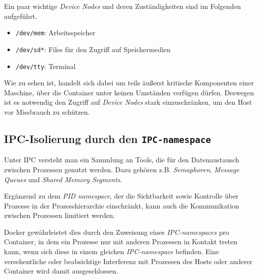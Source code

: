 \documentclass[../main.tex]{subfiles}
\begin{document}
			Ein paar wichtige \emph{Device Nodes} und deren Zuständigkeiten sind im Folgenden aufgeführt.

			\begin{itemize}
				\item \texttt{/dev/mem}: Arbeitsspeicher
				\item \texttt{/dev/sd*}: Files für den Zugriff auf Speichermedien
				\item \texttt{/dev/tty}: Terminal
			\end{itemize}

			Wie zu sehen ist, handelt sich dabei um teils äußerst kritische Komponenten einer Maschine, über die Container unter keinen Umständen verfügen dürfen. Deswegen ist es notwendig den Zugriff auf \emph{Device Nodes} stark einzuschränken, um den Host vor Missbrauch zu schützen.


			\cite[S.4]{dockerSec1}



    \subsection{\acrshort{IPC}-Isolierung durch den \texttt{\acrshort{IPC}-namespace}}
			Unter \acrshort{IPC} versteht man ein Sammlung an Tools, die für den Datenaustausch zwischen Prozessen genutzt werden. Dazu gehören z.B. \emph{Semaphoren}, \emph{Message Queues} und \emph{Shared Memory Segments}.

			Ergänzend zu dem \emph{\acrshort{PID} namespace}, der die Sichtbarkeit sowie Kontrolle über Prozesse in der Prozesshierarchie einschränkt, kann auch die Kommunikation zwischen Prozessen limitiert werden.

			Docker gewährleistet dies durch den Zuweisung eines \emph{\acrshort{IPC}-namespaces} pro Container, in dem ein Prozesse nur mit anderen Prozessen in Kontakt treten kann, wenn sich diese in einem gleichen \emph{\acrshort{IPC}-namespace} befinden. Eine versehentliche oder beabsichtige Interferenz mit Prozessen des Hosts oder anderer Container wird damit ausgeschlossen.
\end{document}
